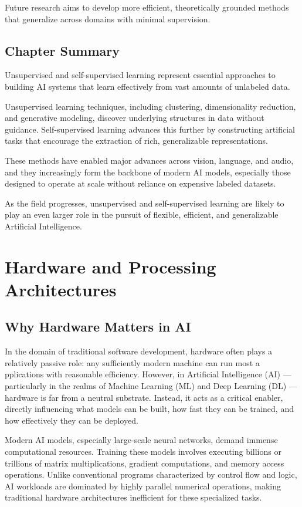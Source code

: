 \documentclass[openany]{book}
\begin{document}
Future research aims to develop more efficient, theoretically grounded methods 
that generalize across domains with minimal supervision.

\section{Chapter Summary}
Unsupervised and self-supervised learning represent essential approaches to 
building AI systems that learn effectively from vast amounts of unlabeled data.

Unsupervised learning techniques, including clustering, dimensionality 
reduction, and generative modeling, discover underlying structures in data 
without guidance. Self-supervised learning advances this further by constructing 
artificial tasks that encourage the extraction of rich, generalizable 
representations.

These methods have enabled major advances across vision, language, and audio, 
and they increasingly form the backbone of modern AI models, especially those 
designed to operate at scale without reliance on expensive labeled datasets.

As the field progresses, unsupervised and self-supervised learning are likely to 
play an even larger role in the pursuit of flexible, efficient, and 
generalizable Artificial Intelligence.


\chapter{Hardware and Processing Architectures}

\section{Why Hardware Matters in AI}

In the domain of traditional software development, hardware often plays a 
relatively passive role: any sufficiently modern machine can run most a
pplications with reasonable efficiency. However, in Artificial Intelligence (AI) 
— particularly in the realms of Machine Learning (ML) and Deep Learning (DL) — 
hardware is far from a neutral substrate. Instead, it acts as a critical 
enabler, directly influencing what models can be built, how fast they can be 
trained, and how effectively they can be deployed.

Modern AI models, especially large-scale neural networks, demand immense 
computational resources. Training these models involves executing billions or 
trillions of matrix multiplications, gradient computations, and memory access 
operations. Unlike conventional programs characterized by control flow and 
logic, AI workloads are dominated by highly parallel numerical operations, 
making traditional hardware architectures inefficient for these specialized 
tasks.
\end{document}
